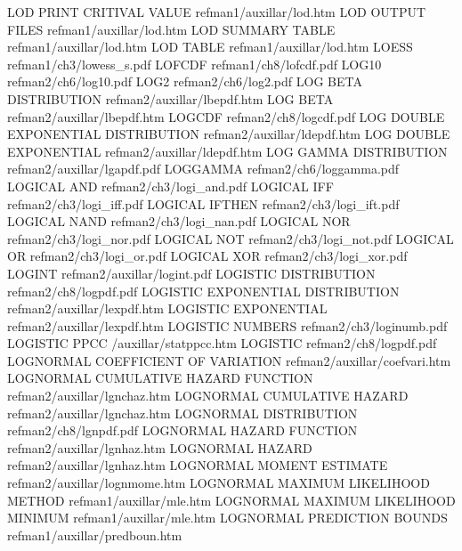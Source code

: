 LOD PRINT CRITIVAL VALUE                refman1/auxillar/lod.htm
LOD OUTPUT FILES                        refman1/auxillar/lod.htm
LOD SUMMARY TABLE                       refman1/auxillar/lod.htm
LOD TABLE                               refman1/auxillar/lod.htm
LOESS                                   refman1/ch3/lowess_s.pdf
LOFCDF                                  refman1/ch8/lofcdf.pdf
LOG10                                   refman2/ch6/log10.pdf
LOG2                                    refman2/ch6/log2.pdf
LOG BETA DISTRIBUTION                   refman2/auxillar/lbepdf.htm
LOG BETA                                refman2/auxillar/lbepdf.htm
LOGCDF                                  refman2/ch8/logcdf.pdf
LOG DOUBLE EXPONENTIAL DISTRIBUTION     refman2/auxillar/ldepdf.htm
LOG DOUBLE EXPONENTIAL                  refman2/auxillar/ldepdf.htm
LOG GAMMA DISTRIBUTION                  refman2/auxillar/lgapdf.pdf
LOGGAMMA                                refman2/ch6/loggamma.pdf
LOGICAL AND                             refman2/ch3/logi_and.pdf
LOGICAL IFF                             refman2/ch3/logi_iff.pdf
LOGICAL IFTHEN                          refman2/ch3/logi_ift.pdf
LOGICAL NAND                            refman2/ch3/logi_nan.pdf
LOGICAL NOR                             refman2/ch3/logi_nor.pdf
LOGICAL NOT                             refman2/ch3/logi_not.pdf
LOGICAL OR                              refman2/ch3/logi_or.pdf
LOGICAL XOR                             refman2/ch3/logi_xor.pdf
LOGINT                                  refman2/auxillar/logint.pdf
LOGISTIC DISTRIBUTION                   refman2/ch8/logpdf.pdf
LOGISTIC EXPONENTIAL DISTRIBUTION       refman2/auxillar/lexpdf.htm
LOGISTIC EXPONENTIAL                    refman2/auxillar/lexpdf.htm
LOGISTIC NUMBERS                        refman2/ch3/loginumb.pdf
LOGISTIC PPCC                           /auxillar/statppcc.htm
LOGISTIC                                refman2/ch8/logpdf.pdf
LOGNORMAL COEFFICIENT OF VARIATION      refman2/auxillar/coefvari.htm
LOGNORMAL CUMULATIVE HAZARD FUNCTION    refman2/auxillar/lgnchaz.htm
LOGNORMAL CUMULATIVE HAZARD             refman2/auxillar/lgnchaz.htm
LOGNORMAL DISTRIBUTION                  refman2/ch8/lgnpdf.pdf
LOGNORMAL HAZARD FUNCTION               refman2/auxillar/lgnhaz.htm
LOGNORMAL HAZARD                        refman2/auxillar/lgnhaz.htm
LOGNORMAL MOMENT ESTIMATE               refman2/auxillar/lognmome.htm
LOGNORMAL MAXIMUM LIKELIHOOD METHOD     refman1/auxillar/mle.htm
LOGNORMAL MAXIMUM LIKELIHOOD MINIMUM    refman1/auxillar/mle.htm
LOGNORMAL PREDICTION BOUNDS             refman1/auxillar/predboun.htm
